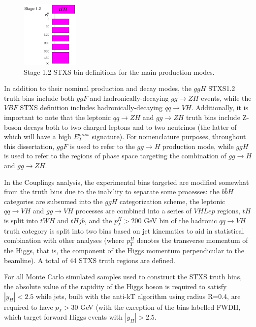 \begin{figure}[tbp]
  \includegraphics[width=0.25\textwidth]{figures/theory_chapter/simplifiedXS_ttH_1_2}
  \caption{Stage 1.2 STXS bin definitions for the main production modes.}
  \label{fig:STXS_scheme}
\end{figure}


In addition to their nominal production and decay modes, the $ggH$ STXS1.2 truth bins include both $ggF$ and hadronically-decaying $gg \rightarrow ZH$ events, while the $VBF$ STXS definition includes hadronically-decaying $qq \rightarrow VH$. Additionally, it is important to note that the leptonic $qq \rightarrow ZH$ and $gg \rightarrow ZH$ truth bins include Z-boson decays both to two charged leptons and to two neutrinos (the latter of which will have a high $E_T^{miss}$ signature). For nomenclature purposes, throughout this dissertation, $ggF$ is used to refer to the $gg \rightarrow H$ production mode, while $ggH$ is used to refer to the regions of phase space targeting the combination of $gg \rightarrow H$ and $gg \rightarrow ZH$.

In the Couplings analysis, the experimental bins targeted are modified somewhat from the truth bins due to the inability to separate some processes: the $b\bar{b}H$ categories are subsumed into the $ggH$ categorization scheme, the leptonic $qq \rightarrow VH$ and $gg \rightarrow VH$ processes are combined into a series of $VHLep$ regions, $tH$ is split into $tWH$ and $tHjb$, and the $p_{T}^H > 200$ GeV bin of the hadronic $qq \rightarrow VH$ truth category is split into two bins based on jet kinematics to aid in statistical combination with other analyses (where $p_{T}^{H}$ denotes the transverse momentum of the Higgs, that is, the component of the Higgs momentum perpendicular to the beamline). A total of 44 STXS truth regions are defined.

For all Monte Carlo simulated samples used to construct the STXS truth bins, the absolute value of the rapidity of the Higgs boson is required to satisfy $|y_{H}| < 2.5$ while jets, built with the anti-kT algorithm \cite{antikt} using radius R=0.4, are required to have $p_{T} > 30$ GeV (with the exception of the bins labelled FWDH, which target forward Higgs events with $|y_{H}| > 2.5$.

